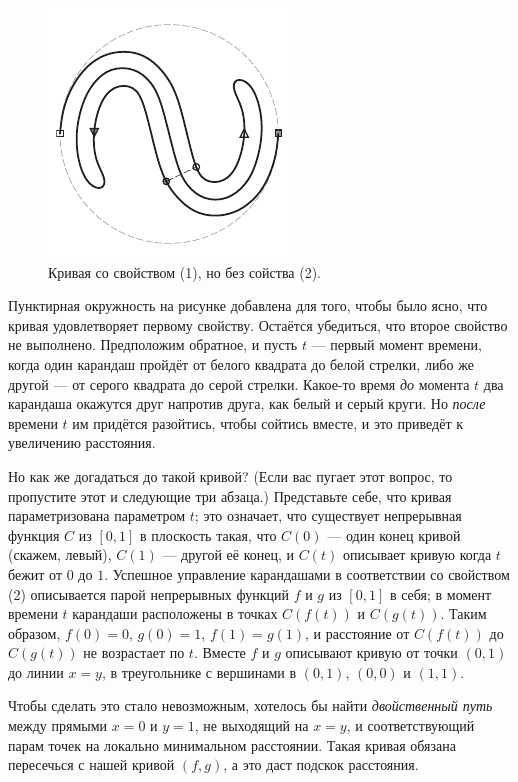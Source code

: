 \begin{figure}[htb!]
\centering
\includegraphics[scale=1]{pics/ss-curve}
\caption{Кривая со свойством (1), но без сойства (2).}
\label{pic:ss-curve}
\end{figure}

Пунктирная окружность на рисунке добавлена для того, чтобы было ясно, что кривая удовлетворяет первому свойству.
Остаётся убедиться, что второе свойство не выполнено.
Предположим обратное, и пусть $t$ --- первый момент времени, когда один карандаш пройдёт от белого квадрата до белой стрелки,
либо же другой --- от серого квадрата до серой стрелки.
Какое-то время \emph{до} момента $t$ два карандаша окажутся друг напротив друга, как белый и серый круги.
Но \emph{после} времени $t$ им придётся разойтись, чтобы сойтись вместе, и это приведёт к увеличению расстояния.

Но как же догадаться до такой кривой?
(Если вас пугает этот вопрос, то пропустите этот и следующие три абзаца.)
Представьте себе, что кривая параметризована параметром $t$;
это означает, что существует непрерывная функция $C$ из $[0, 1]$ в плоскость такая, что $C(0)$ --- один конец кривой (скажем, левый), $C(1)$ --- другой её конец, и $C(t)$ описывает кривую когда $t$ бежит от $0$ до $1$.
Успешное управление карандашами в соответствии со свойством (2) описывается парой непрерывных функций $f$ и $g$ из $[0,1]$ в себя;
в момент времени $t$ карандаши расположены в точках $C(f(t))$ и $C(g(t))$.
Таким образом, $f (0) = 0$, $g(0) = 1$, $f (1) = g(1)$, и расстояние от $C(f (t))$ до $C(g(t))$ не возрастает по $t$.
Вместе $f$ и $g$ описывают кривую от точки $(0,1)$ до линии $x = y$, в треугольнике с вершинами в $(0,1)$, $(0,0)$ и $(1,1)$.

Чтобы сделать это стало невозможным, хотелось бы найти \emph{двойственный путь} между прямыми $x = 0$ и $y = 1$, не выходящий на $x = y$, и соответствующий парам точек на локально минимальном расстоянии.
Такая кривая обязана пересечься с нашей кривой $(f, g)$, а это даст подскок расстояния.

